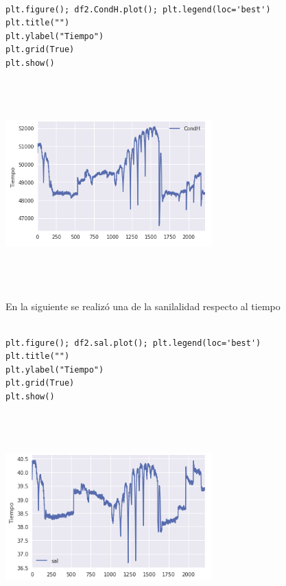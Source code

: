 \documentclass{article}
\begin{document}
\begin{verbatim}

plt.figure(); df2.CondH.plot(); plt.legend(loc='best')
plt.title("")
plt.ylabel("Tiempo")
plt.grid(True)
plt.show()

\end{verbatim}



\begin{center}
\includegraphics[width=8cm, height=8cm]{graf1.png}
\end{center}

En la siguiente se realizó una de la sanilalidad respecto al tiempo
\begin{verbatim}

plt.figure(); df2.sal.plot(); plt.legend(loc='best')
plt.title("")
plt.ylabel("Tiempo")
plt.grid(True)
plt.show()

\end{verbatim}

\begin{center}

\includegraphics[width=8cm, height=8cm]{graf2.png}
\end{center}
\end{document}
